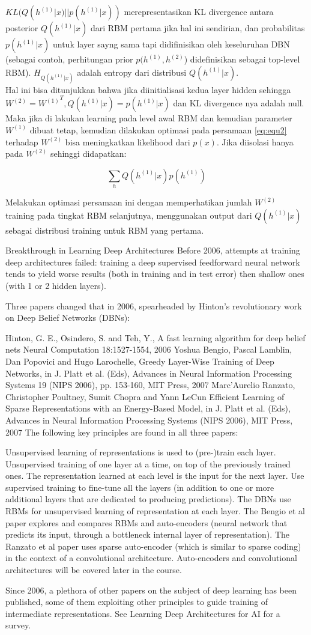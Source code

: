 \documentclass[12pt]{article}
\begin{document}
$KL(Q(h^{(1)}|x) || p(h^{(1)}|x))$ merepresentasikan KL divergence antara posterior $Q(h^{(1)}|x)$ dari RBM pertama jika hal ini sendirian, dan probabilitas $p(h^{(1)}|x)$ untuk layer sayng sama tapi didifinisikan oleh keseluruhan DBN (sebagai contoh, perhitungan prior $p(h^{(1)},h^{(2)}$) didefinisikan sebagai top-level RBM). $H_{Q(h^{(1)}|x)}$ adalah entropy dari distribusi $Q(h^{(1)}|x)$.\\
Hal ini bisa ditunjukkan bahwa jika diinitialisasi kedua layer hidden sehingga $W^{(2)}={W^{(1)}}^T, Q(h^{(1)}|x)=p(h^{(1)}|x)$ dan KL divergence nya adalah null. Maka jika di lakukan learning pada level awal RBM dan kemudian parameter $ W^{(1)}$ dibuat tetap, kemudian dilakukan optimasi pada persamaan \ref{eq:equ2} terhadap $W^{(2)}$ bisa meningkatkan likelihood dari $p(x)$.
Jika diisolasi hanya pada $W^{(2)}$ sehinggi didapatkan:

\[\sum_h Q(h^{(1)}|x)p(h^{(1)})\]

Melakukan optimasi persamaan ini dengan memperhatikan jumlah $W^{(2)}$ training pada tingkat RBM selanjutnya, menggunakan output dari $Q(h^{(1)}|x)$ sebagai distribusi training untuk RBM yang pertama.

Breakthrough in Learning Deep Architectures
Before 2006, attempts at training deep architectures failed: training a deep supervised feedforward neural network tends to yield worse results (both in training and in test error) then shallow ones (with 1 or 2 hidden layers).

Three papers changed that in 2006, spearheaded by Hinton’s revolutionary work on Deep Belief Networks (DBNs):

Hinton, G. E., Osindero, S. and Teh, Y., A fast learning algorithm for deep belief nets Neural Computation 18:1527-1554, 2006
Yoshua Bengio, Pascal Lamblin, Dan Popovici and Hugo Larochelle, Greedy Layer-Wise Training of Deep Networks, in J. Platt et al. (Eds), Advances in Neural Information Processing Systems 19 (NIPS 2006), pp. 153-160, MIT Press, 2007
Marc’Aurelio Ranzato, Christopher Poultney, Sumit Chopra and Yann LeCun Efficient Learning of Sparse Representations with an Energy-Based Model, in J. Platt et al. (Eds), Advances in Neural Information Processing Systems (NIPS 2006), MIT Press, 2007
The following key principles are found in all three papers:

Unsupervised learning of representations is used to (pre-)train each layer.
Unsupervised training of one layer at a time, on top of the previously trained ones. The representation learned at each level is the input for the next layer.
Use supervised training to fine-tune all the layers (in addition to one or more additional layers that are dedicated to producing predictions).
The DBNs use RBMs for unsupervised learning of representation at each layer. The Bengio et al paper explores and compares RBMs and auto-encoders (neural network that predicts its input, through a bottleneck internal layer of representation). The Ranzato et al paper uses sparse auto-encoder (which is similar to sparse coding) in the context of a convolutional architecture. Auto-encoders and convolutional architectures will be covered later in the course.

Since 2006, a plethora of other papers on the subject of deep learning has been published, some of them exploiting other principles to guide training of intermediate representations. See Learning Deep Architectures for AI for a survey.
\end{document}
